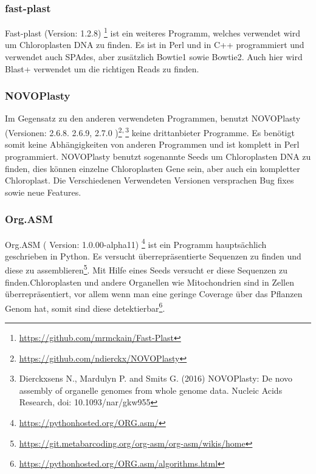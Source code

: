 \documentclass{scrartcl}
\begin{document}
\subsubsection{fast-plast}
\label{sec-2-5-2}
Fast-plast  (Version: 1.2.8) \footnote{\url{https://github.com/mrmckain/Fast-Plast}} ist ein weiteres Programm, welches verwendet wird um Chloroplasten DNA zu finden. Es ist in Perl und in C++ programmiert und verwendet auch SPAdes, 
aber zusätzlich Bowtie1 sowie Bowtie2. Auch hier wird Blast+ verwendet um die richtigen Reads zu finden. 
\subsubsection{NOVOPlasty}
\label{sec-2-5-3}
Im Gegensatz zu den anderen verwendeten Programmen, benutzt NOVOPlasty (Versionen: 2.6.8. 2.6.9, 2.7.0 )\footnote{\url{https://github.com/ndierckx/NOVOPlasty}}\textsuperscript{,}\,\footnote{Dierckxsens N., Mardulyn P. and Smits G. (2016) NOVOPlasty: De novo assembly of organelle genomes from whole genome data. Nucleic Acids Research, doi: 10.1093/nar/gkw955} keine drittanbieter Programme. Es benötigt somit keine Abhängigkeiten von anderen Programmen
und ist komplett in Perl programmiert. NOVOPlasty benutzt sogenannte Seeds um Chloroplasten DNA zu finden, dies können einzelne Chloroplasten Gene sein, aber auch ein kompletter Chloroplast.
Die Verschiedenen Verwendeten Versionen versprachen Bug fixes sowie neue Features. 
\subsubsection{Org.ASM}
\label{sec-2-5-4}
Org.ASM ( Version: 1.0.00-alpha11) \footnote{\url{https://pythonhosted.org/ORG.asm/}} ist ein Programm hauptsächlich geschrieben in Python. Es versucht überrepräsentierte Sequenzen zu finden und diese zu assemblieren\footnote{\url{https://git.metabarcoding.org/org-asm/org-asm/wikis/home}}. 
Mit Hilfe eines Seeds versucht er diese Sequenzen zu finden.Chloroplasten und andere Organellen wie Mitochondrien sind in Zellen überrepräsentiert, vor allem
wenn man eine geringe Coverage über das Pflanzen Genom hat, somit sind diese detektierbar\footnote{\url{https://pythonhosted.org/ORG.asm/algorithms.html}}.
\end{document}

